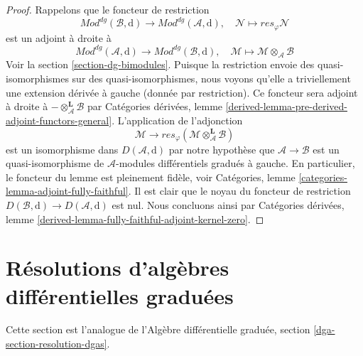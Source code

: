\begin{proof}
Rappelons que le foncteur de restriction
$$
\textit{Mod}^{dg}(\mathcal{B}, \text{d}) \to
\textit{Mod}^{dg}(\mathcal{A}, \text{d}),\quad
\mathcal{N} \mapsto res_\varphi \mathcal{N}
$$ est
un adjoint à droite à
$$
\textit{Mod}^{dg}(\mathcal{A}, \text{d}) \to
\textit{Mod}^{dg}(\mathcal{B}, \text{d}),\quad
\mathcal{M} \mapsto \mathcal{M} \otimes_\mathcal{A} \mathcal{B}
$$ Voir la
section \ref{section-dg-bimodules}. Puisque la restriction
envoie des quasi-isomorphismes sur des quasi-isomorphismes, nous
voyons qu'elle a triviellement une extension dérivée à
gauche (donnée par restriction). Ce foncteur sera adjoint
à droite à $- \otimes_\mathcal{A}^\mathbf{L} \mathcal{B}$
par Catégories dérivées,
lemme \ref{derived-lemma-pre-derived-adjoint-functors-general}.
L'application
de l'adjonction $$
\mathcal{M} \to
res_\varphi(\mathcal{M} \otimes_\mathcal{A}^\mathbf{L} \mathcal{B})
$$
est un isomorphisme dans $D(\mathcal{A}, \text{d})$ par
notre hypothèse que $\mathcal{A} \to \mathcal{B}$ est un
quasi-isomorphisme de $\mathcal{A}$-modules différentiels gradués à gauche.
En particulier, le foncteur du lemme est pleinement
fidèle, voir Catégories, lemme \ref{categories-lemma-adjoint-fully-faithful}.
Il est clair que le noyau du foncteur de restriction
$D(\mathcal{B}, \text{d}) \to D(\mathcal{A}, \text{d})$
est nul. Nous concluons ainsi par Catégories dérivées,
lemme \ref{derived-lemma-fully-faithful-adjoint-kernel-zero}.
\end{proof}













\section{Résolutions d'algèbres différentielles graduées}
\label{section-resolution-dgas}

\noindent
Cette section est l'analogue de
l'Algèbre différentielle graduée, section \ref{dga-section-resolution-dgas}.

